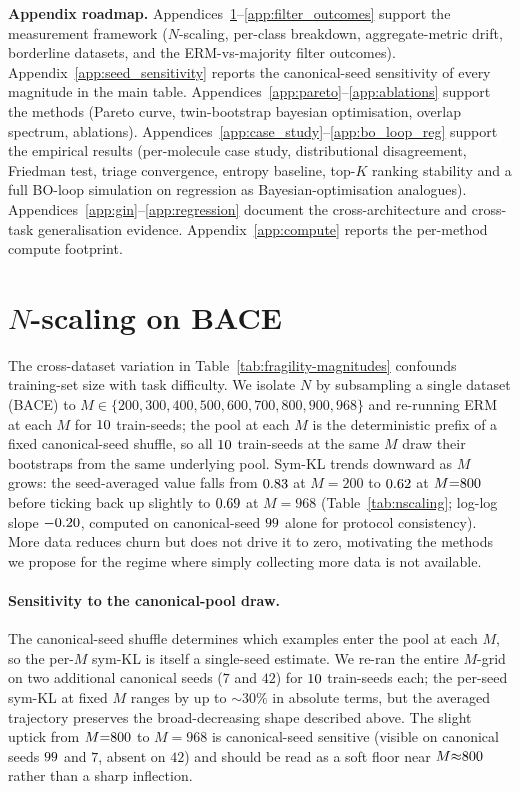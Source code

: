 \noindent\textbf{Appendix roadmap.}
Appendices~\ref{app:nscaling}--\ref{app:filter_outcomes} support the
measurement framework ($N$-scaling, per-class breakdown,
aggregate-metric drift, borderline datasets, and the
ERM-vs-majority filter outcomes).
Appendix~\ref{app:seed_sensitivity} reports the canonical-seed
sensitivity of every magnitude in the main table.
Appendices~\ref{app:pareto}--\ref{app:ablations} support the methods
(Pareto curve, twin-bootstrap bayesian optimisation, overlap
spectrum, ablations).
Appendices~\ref{app:case_study}--\ref{app:bo_loop_reg} support the
empirical results (per-molecule case study, distributional
disagreement, Friedman test, triage convergence, entropy baseline,
top-$K$ ranking stability and a full BO-loop simulation on regression
as Bayesian-optimisation analogues).
Appendices~\ref{app:gin}--\ref{app:regression} document the
cross-architecture and cross-task generalisation evidence.
Appendix~\ref{app:compute} reports the per-method compute footprint.

\section{\boldmath$N$-scaling on BACE}
\label{app:nscaling}

The cross-dataset variation in Table~\ref{tab:fragility-magnitudes}
confounds training-set size with task difficulty.  We isolate $N$ by
subsampling a single dataset (BACE) to
$M \in \{200, 300, 400, 500, 600, 700, 800, 900, 968\}$ and re-running
ERM at each $M$ for $10$ train-seeds; the pool at each $M$ is the
deterministic prefix of a fixed canonical-seed shuffle, so all
$10$ train-seeds at the same $M$ draw their bootstraps from the
same underlying pool.  Sym-KL trends downward as $M$ grows: the
seed-averaged value falls from $0.83$ at $M{=}200$ to
$0.62$ at $M{=}800$ before ticking back up
slightly to $0.69$ at $M{=}968$ (Table~\ref{tab:nscaling};
log-log slope $-0.20$, computed on canonical-seed
$99$ alone for protocol consistency).  More data reduces
churn but does not drive it to zero, motivating the methods we
propose for the regime where simply collecting more data is not
available.



\paragraph{Sensitivity to the canonical-pool draw.}  The
canonical-seed shuffle determines which examples enter the pool at
each $M$, so the per-$M$ sym-KL is itself a single-seed estimate.  We
re-ran the entire $M$-grid on two additional canonical seeds ($7$ and
$42$) for $10$ train-seeds each; the per-seed sym-KL at fixed $M$
ranges by up to $\sim$$30\%$ in absolute terms, but the averaged
trajectory preserves the broad-decreasing shape described above.
The slight uptick from $M{=}800$ to $M{=}968$ is
canonical-seed sensitive (visible on canonical seeds $99$
and $7$, absent on $42$) and should be read as a soft floor near
$M{\approx}800$ rather than a sharp inflection.

